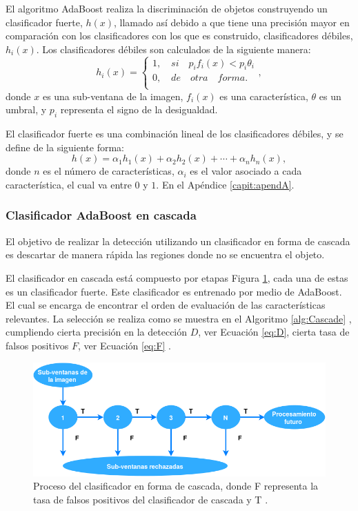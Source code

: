El algoritmo AdaBoost realiza la discriminación de objetos construyendo un clasificador fuerte, $h(x)$, llamado así debido a que tiene una precisión mayor en comparación con los clasificadores con los que es construido, clasificadores débiles, $h_i(x)$. Los clasificadores débiles son calculados de la siguiente manera: 
\begin{equation}
h_i(x)=
\begin{cases}   
1, \quad si \quad  p_if_i(x)<p_i \theta_i \\
0, \quad de \quad otra \quad forma.\\
\end{cases} ,
\end{equation}
donde $x$ es una sub-ventana de la imagen, $f_i(x)$ es una característica, $\theta$ es un umbral, y $p_i$ representa el signo de la desigualdad.   

El clasificador fuerte es una combinación lineal de los clasificadores débiles, y se define de la siguiente forma: 
\begin{equation}
h(x)= \alpha_1h_1(x)+\alpha_2h_2(x)+ \cdots +\alpha_nh_n(x) ,
\end{equation}
donde $n$ es el n\'umero de características, $\alpha_i$ es el valor asociado a cada característica, el cual va entre $0$ y $1$. En el Apéndice \ref{capit:apendA}.

\subsubsection{Clasificador AdaBoost en cascada}\label{sssec:AdaboostCascade}   

El objetivo de realizar la detección utilizando un clasificador en forma de cascada es descartar de manera rápida las regiones donde no se encuentra el objeto.

El clasificador en cascada está compuesto por etapas Figura \ref{fig:Cascade}, cada una de estas es un clasificador fuerte. Este clasificador es entrenado por medio de AdaBoost. El cual se encarga de encontrar el orden de evaluación de las características relevantes. 
La selección se realiza como se muestra en el Algoritmo \ref{alg:Cascade} , cumpliendo cierta precisión en la detección $D$, ver Ecuación \ref{eq:D}, cierta tasa de falsos positivos $F$, ver Ecuación \ref{eq:F} .

\begin{figure}[h!]
\begin{center}
\includegraphics[scale=.60]{./Figures/DCascade.png}
\end{center}
\caption{Proceso del clasificador en forma de cascada, donde F representa la tasa de falsos positivos del clasificador de cascada y T .}
\label{fig:Cascade}
\end{figure}

